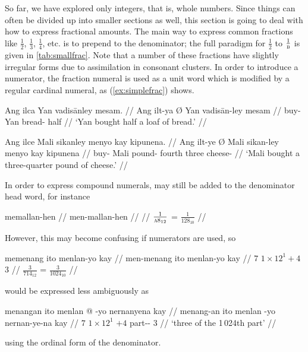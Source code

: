So far, we have explored only integers, that is, whole numbers. Since things
can often be divided up into smaller sections as well, this section is going to
deal with how to express fractional amounts. The main way to express common
fractions like $\frac{1}{2}$, $\frac{1}{3}$, $\frac{1}{4}$, etc. is to prepend
 to the denominator; the full paradigm for $\frac{1}{2}$
to $\frac{1}{\textsc{b}}$ is given in \autoref{tab:smallfrac}. Note that a number of
these fractions have slightly irregular forms due to assimilation in consonant
clusters. In order to introduce a numerator, the fraction numeral is used as a
unit word which is modified by a regular cardinal numeral, as
(\ref{ex:simplefrac}) shows.

\pex\label{ex:simplefrac}
\a\begingl
	\gla Ang ilca {} Yan vadisānley mesam. //
	\glb Ang ilt-ya Ø Yan vadisān-ley mesam //
	\glc \AgtT{} buy-\TsgM{} \Top{} Yan bread-\PargI{} half //
	\glft `Yan bought half a loaf of bread.' //
\endgl

\a\begingl
	\gla Ang ilce {} Mali sikanley menyo kay kipunena. //
	\glb Ang ilt-ye Ø Mali sikan-ley menyo kay kipunena //
	\glc \AgtT{} buy-\TsgM{} \Top{} Mali pound-\PargI{} fourth three
		cheese-\Gen{} //
	\glft `Mali bought a three-quarter pound of cheese.' //
\endgl
\xe

In order to express compound numerals,  may still be added to
the denominator head word, for instance

\ex
\begingl
	\gla memallan-hen //
	\glb men-mallan-hen //
	 //
	\glft $\frac{1}{\textsc{a}8_{12}}$ = $\frac{1}{128_{10}}$ //
\endgl
\xe

\noindent However, this may become confusing if numerators are used, so %

\ex
\ljudge\ques\begingl
	\gla memenang ito menlan-yo kay //
	\glb men-menang ito menlan-yo kay //
	 {$7$} {$1 \times 12^1 + 4$} {$3$} //
	\glft $\frac{3}{714_{12}}$ = $\frac{3}{1024_{10}}$ //
\endgl
\xe

\noindent would be expressed less ambiguously as

\ex
\begingl
	\gla menangan ito menlan @ -yo nernanyena kay //
	\glb menang-an ito menlan -yo nernan-ye-na kay //
	 {$7$} {$1 \times 12^1$} {$+4$} part-\Pl{}-\Gen{} 
		$3$ //
	\glft `three of the 1\,024th part' //
\endgl
\xe

\noindent using the ordinal form of the denominator.


